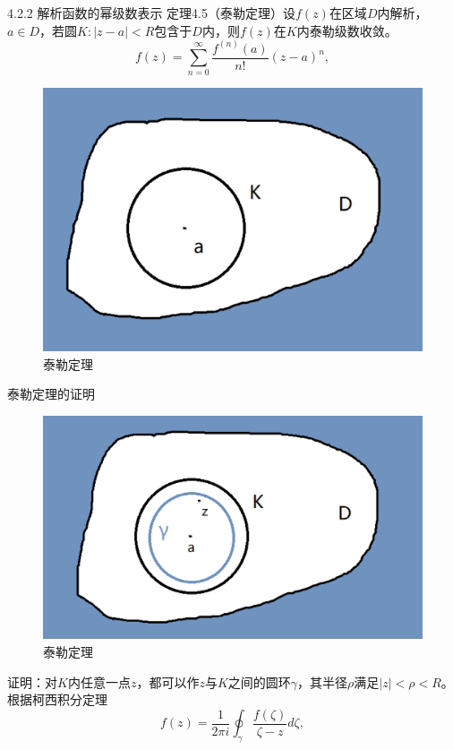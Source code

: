 \documentclass[11pt]{beamer}
\begin{document}
\begin{frame}{4.2.2 解析函数的幂级数表示}
定理4.5（泰勒定理）设$f(z)$在区域$D$内解析，$a \in D$，若圆$K:|z-a|<R$包含于$D$内，则$f(z)$在$K$内泰勒级数收敛。
\begin{equation}
f(z) = \sum_{n=0}^{\infty} \frac{f^{(n)}(a)}{n!}(z-a)^n,
\end{equation}
\begin{figure}
	\centering
	\includegraphics[width=0.5\linewidth]{泰勒定理1}
	\caption{泰勒定理}
	\label{fig:1}
\end{figure}

\end{frame}

\begin{frame}{泰勒定理的证明}
\begin{figure}
	\centering
	\includegraphics[width=0.5\linewidth]{泰勒定理2}
	\caption{泰勒定理}
	\label{fig:2}
\end{figure}
证明：对$K$内任意一点$z$，都可以作$z$与$K$之间的圆环$\gamma$，其半径$\rho$满足$ |z| < \rho < R$。
根据柯西积分定理
\begin{equation}
f(z) = \frac{1}{2\pi i} \oint_\gamma \frac{ f(\zeta)}{\zeta - z} d \zeta,
\end{equation}

\end{frame}
\end{document}

